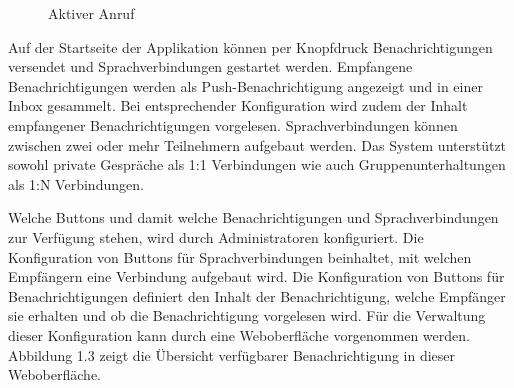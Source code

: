 \begin{figure}[h]
\begin{minipage}[b]{0.4\textwidth}
        \caption{Aktiver Anruf}
    \end{minipage}
    \label{fig:MobileClient-ScreensIntroduction}
\end{figure}

Auf der Startseite der Applikation können per Knopfdruck Benachrichtigungen versendet und Sprachverbindungen gestartet werden.
Empfangene Benachrichtigungen werden als Push-Benachrichtigung angezeigt und in einer Inbox gesammelt.
Bei entsprechender Konfiguration wird zudem der Inhalt empfangener Benachrichtigungen vorgelesen.
Sprachverbindungen können zwischen zwei oder mehr Teilnehmern aufgebaut werden.
Das System unterstützt sowohl private Gespräche als 1:1 Verbindungen wie auch Gruppenunterhaltungen als 1:N Verbindungen.

Welche Buttons und damit welche Benachrichtigungen und Sprachverbindungen zur Verfügung stehen, wird durch Administratoren konfiguriert.
Die Konfiguration von Buttons für Sprachverbindungen beinhaltet, mit welchen Empfängern eine Verbindung aufgebaut wird.
Die Konfiguration von Buttons für Benachrichtigungen definiert den Inhalt der Benachrichtigung, welche Empfänger sie erhalten und ob die Benachrichtigung vorgelesen wird.
Für die Verwaltung dieser Konfiguration kann durch eine Weboberfläche vorgenommen werden.
Abbildung 1.3 zeigt die Übersicht verfügbarer Benachrichtigung in dieser Weboberfläche.

